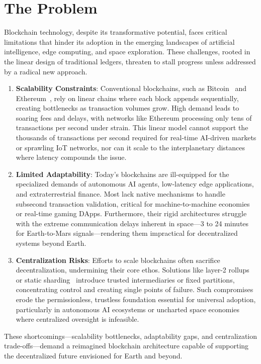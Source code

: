 \section{The Problem}
Blockchain technology, despite its transformative potential, faces critical limitations that hinder its adoption in the emerging landscapes of artificial intelligence, edge computing, and space exploration. These challenges, rooted in the linear design of traditional ledgers, threaten to stall progress unless addressed by a radical new approach.

\begin{enumerate}
    \item \textbf{Scalability Constraints}: Conventional blockchains, such as Bitcoin~\cite{nakamoto2008bitcoin} and Ethereum~\cite{buterin2014ethereum}, rely on linear chains where each block appends sequentially, creating bottlenecks as transaction volumes grow. High demand leads to soaring fees and delays, with networks like Ethereum processing only tens of transactions per second under strain. This linear model cannot support the thousands of transactions per second required for real-time AI-driven markets or sprawling IoT networks, nor can it scale to the interplanetary distances where latency compounds the issue.

    \item \textbf{Limited Adaptability}: Today’s blockchains are ill-equipped for the specialized demands of autonomous AI agents, low-latency edge applications, and extraterrestrial finance. Most lack native mechanisms to handle subsecond transaction validation, critical for machine-to-machine economies or real-time gaming DApps. Furthermore, their rigid architectures struggle with the extreme communication delays inherent in space—3 to 24 minutes for Earth-to-Mars signals—rendering them impractical for decentralized systems beyond Earth.

    \item \textbf{Centralization Risks}: Efforts to scale blockchains often sacrifice decentralization, undermining their core ethos. Solutions like layer-2 rollups or static sharding~\cite{wang2019sharding} introduce trusted intermediaries or fixed partitions, concentrating control and creating single points of failure. Such compromises erode the permissionless, trustless foundation essential for universal adoption, particularly in autonomous AI ecosystems or uncharted space economies where centralized oversight is infeasible.
\end{enumerate}

These shortcomings—scalability bottlenecks, adaptability gaps, and centralization trade-offs—demand a reimagined blockchain architecture capable of supporting the decentralized future envisioned for Earth and beyond.